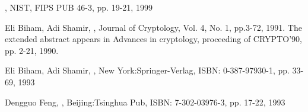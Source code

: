 \documentclass[a4paper,10pt]{article}
\begin{document}
\begin{thebibliography}{4}

,
\newblock NIST, FIPS PUB 46-3, pp. 19-21, 1999

Eli Biham, Adi Shamir, 
,
\newblock Journal of Cryptology, Vol. 4, No. 1, pp.3-72, 1991. The extended abstract appears in Advances in cryptology, proceeding of CRYPTO'90, pp. 2-21, 1990.

Eli Biham, Adi Shamir,
,
\newblock New York:Springer-Verlag, ISBN: 0-387-97930-1, pp. 33-69, 1993

Dengguo Feng,
,
\newblock Beijing:Tsinghua Pub, ISBN: 7-302-03976-3, pp. 17-22, 1993
\end{thebibliography}
\end{document}
